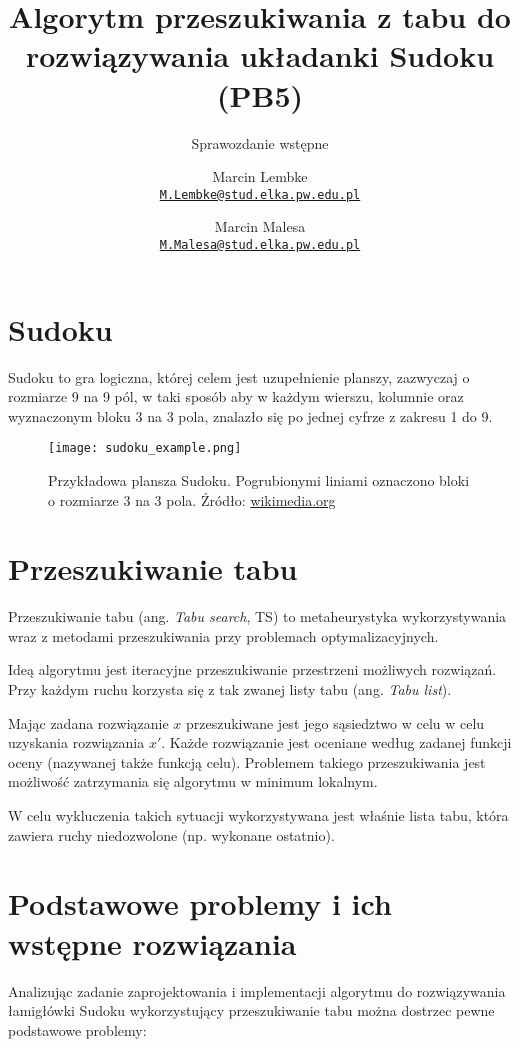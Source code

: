 \documentclass[]{project_report}
\author{%
	Marcin Lembke\\
	\texttt{\href{mailto:M.Lembke@stud.elka.pw.edu.pl}%
			{\nolinkurl{M.Lembke@stud.elka.pw.edu.pl}}}
	\and
	Marcin Malesa\\
	\texttt{\href{mailto:M.Malesa@stud.elka.pw.edu.pl}%
			{\nolinkurl{M.Malesa@stud.elka.pw.edu.pl}}}
}
\title{Algorytm przeszukiwania z tabu do rozwiązywania układanki Sudoku (PB5)}
\subtitle{Sprawozdanie wstępne}
\begin{document}
	\maketitle
	
	\section{Sudoku}
	Sudoku to gra logiczna, której celem jest uzupełnienie planszy, zazwyczaj o rozmiarze 9 na 9 pól, w taki sposób aby w każdym wierszu, kolumnie oraz wyznaczonym bloku 3 na 3 pola, znalazło się po jednej cyfrze z zakresu 1 do 9.
	
	\begin{figure}[H]
		\centering
		\texttt{[image: sudoku\_example.png]}
		\caption{Przykładowa plansza Sudoku. Pogrubionymi liniami oznaczono bloki o rozmiarze 3 na 3 pola. Źródło: \href{https://upload.wikimedia.org/wikipedia/commons/2/2d/Sudoku_przyklad.png}{wikimedia.org}}
	\end{figure}
	
	\section{Przeszukiwanie tabu}
	Przeszukiwanie tabu (ang. \textit{Tabu search}, TS) to metaheurystyka wykorzystywania wraz z metodami przeszukiwania przy problemach optymalizacyjnych.
	
	Ideą algorytmu jest iteracyjne przeszukiwanie przestrzeni możliwych rozwiązań. Przy każdym ruchu korzysta się z tak zwanej listy tabu (ang. \textit{Tabu list}).
	
	Mając zadana rozwiązanie \(x\) przeszukiwane jest jego sąsiedztwo w celu w celu uzyskania rozwiązania \(x'\). Każde rozwiązanie jest oceniane według zadanej funkcji oceny (nazywanej także funkcją celu). Problemem takiego przeszukiwania jest możliwość zatrzymania się algorytmu w minimum lokalnym.
	
	W celu wykluczenia takich sytuacji wykorzystywana jest właśnie lista tabu, która zawiera ruchy niedozwolone (np. wykonane ostatnio).
	
	\section{Podstawowe problemy i ich wstępne rozwiązania}
	Analizując zadanie zaprojektowania i implementacji algorytmu do rozwiązywania łamigłówki Sudoku wykorzystujący przeszukiwanie tabu można dostrzec pewne podstawowe problemy:
	
\end{document}
